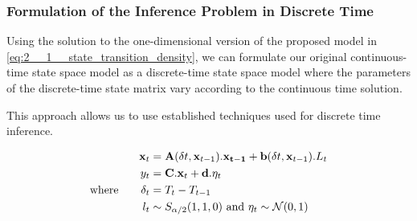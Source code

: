 \documentclass[../main.tex]{subfiles}
\begin{document}
\subsubsection{Formulation of the Inference Problem in Discrete Time}

Using the solution to the one-dimensional version of the proposed model in \autoref{eq:2__1__state_transition_density}, we can formulate our original continuous-time state space model as a discrete-time state space model where the parameters of the discrete-time state matrix vary according to the continuous time solution. 

This approach allows us to use established techniques used for discrete time inference.  

\begin{align}
    \mathbf{x}_t & = \mathbf{A}(\delta t, \mathbf{x}_{t-1}) . \mathbf{x_{t-1}} + \mathbf{b}( \delta t, \mathbf{x}_{t-1} ) . L_t \notag\\
    y_t & = \mathbf{C} . \mathbf{x}_t + \mathbf{d} . \mathbf{\eta}_t \\
    \text{where} \qquad \delta_t & = T_t - T_{t-1} \notag \\
    l_t & \sim S_{\alpha/2}(1,1,0) \text{  and  } \eta_t \sim \mathcal{N}(0,1) \notag
\end{align}
\end{document}
